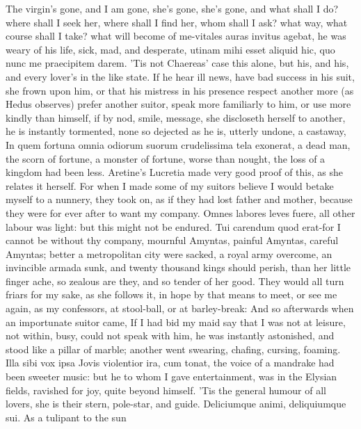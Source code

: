 {The virgin's gone, and I am gone, she's gone, she's gone, and what
shall I do? where shall I seek her, where shall I find her, whom shall
I ask? what way, what course shall I take? what will become of
me-vitales auras invitus agebat, he was weary of his life, sick,
mad, and desperate, utinam mihi esset aliquid hic, quo nunc me
praecipitem darem. 'Tis not Chaereas' case this alone, but his, and
his, and every lover's in the like state. If he hear ill news, have bad
success in his suit, she frown upon him, or that his mistress in his
presence respect another more (as Hedus observes) prefer another
suitor, speak more familiarly to him, or use more kindly than himself,
if by nod, smile, message, she discloseth herself to another, he is
instantly tormented, none so dejected as he is, utterly undone, a
castaway, In quem fortuna omnia odiorum suorum crudelissima tela
exonerat, a dead man, the scorn of fortune, a monster of fortune, worse
than nought, the loss of a kingdom had been less. Aretine's
Lucretia made very good proof of this, as she relates it herself. For
when I made some of my suitors believe I would betake myself to a
nunnery, they took on, as if they had lost father and mother, because
they were for ever after to want my company. Omnes labores leves fuere,
all other labour was light: but this might not be endured. Tui
carendum quod erat-for I cannot be without thy company, mournful
Amyntas, painful Amyntas, careful Amyntas; better a metropolitan city
were sacked, a royal army overcome, an invincible armada sunk, and
twenty thousand kings should perish, than her little finger ache, so
zealous are they, and so tender of her good. They would all turn friars
for my sake, as she follows it, in hope by that means to meet, or see
me again, as my confessors, at stool-ball, or at barley-break: And so
afterwards when an importunate suitor came, If I had bid my maid
say that I was not at leisure, not within, busy, could not speak with
him, he was instantly astonished, and stood like a pillar of marble;
another went swearing, chafing, cursing, foaming. Illa sibi vox
ipsa Jovis violentior ira, cum tonat, \etc{} the voice of a mandrake had
been sweeter music: but he to whom I gave entertainment, was in the
Elysian fields, ravished for joy, quite beyond himself. 'Tis the
general humour of all lovers, she is their stern, pole-star, and guide.
Deliciumque animi, deliquiumque sui. As a tulipant to the sun
}
